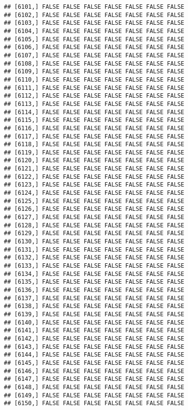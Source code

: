\documentclass[
]{article}
\begin{document}
\begin{verbatim}
## [6101,] FALSE FALSE FALSE FALSE FALSE FALSE FALSE
## [6102,] FALSE FALSE FALSE FALSE FALSE FALSE FALSE
## [6103,] FALSE FALSE FALSE FALSE FALSE FALSE FALSE
## [6104,] FALSE FALSE FALSE FALSE FALSE FALSE FALSE
## [6105,] FALSE FALSE FALSE FALSE FALSE FALSE FALSE
## [6106,] FALSE FALSE FALSE FALSE FALSE FALSE FALSE
## [6107,] FALSE FALSE FALSE FALSE FALSE FALSE FALSE
## [6108,] FALSE FALSE FALSE FALSE FALSE FALSE FALSE
## [6109,] FALSE FALSE FALSE FALSE FALSE FALSE FALSE
## [6110,] FALSE FALSE FALSE FALSE FALSE FALSE FALSE
## [6111,] FALSE FALSE FALSE FALSE FALSE FALSE FALSE
## [6112,] FALSE FALSE FALSE FALSE FALSE FALSE FALSE
## [6113,] FALSE FALSE FALSE FALSE FALSE FALSE FALSE
## [6114,] FALSE FALSE FALSE FALSE FALSE FALSE FALSE
## [6115,] FALSE FALSE FALSE FALSE FALSE FALSE FALSE
## [6116,] FALSE FALSE FALSE FALSE FALSE FALSE FALSE
## [6117,] FALSE FALSE FALSE FALSE FALSE FALSE FALSE
## [6118,] FALSE FALSE FALSE FALSE FALSE FALSE FALSE
## [6119,] FALSE FALSE FALSE FALSE FALSE FALSE FALSE
## [6120,] FALSE FALSE FALSE FALSE FALSE FALSE FALSE
## [6121,] FALSE FALSE FALSE FALSE FALSE FALSE FALSE
## [6122,] FALSE FALSE FALSE FALSE FALSE FALSE FALSE
## [6123,] FALSE FALSE FALSE FALSE FALSE FALSE FALSE
## [6124,] FALSE FALSE FALSE FALSE FALSE FALSE FALSE
## [6125,] FALSE FALSE FALSE FALSE FALSE FALSE FALSE
## [6126,] FALSE FALSE FALSE FALSE FALSE FALSE FALSE
## [6127,] FALSE FALSE FALSE FALSE FALSE FALSE FALSE
## [6128,] FALSE FALSE FALSE FALSE FALSE FALSE FALSE
## [6129,] FALSE FALSE FALSE FALSE FALSE FALSE FALSE
## [6130,] FALSE FALSE FALSE FALSE FALSE FALSE FALSE
## [6131,] FALSE FALSE FALSE FALSE FALSE FALSE FALSE
## [6132,] FALSE FALSE FALSE FALSE FALSE FALSE FALSE
## [6133,] FALSE FALSE FALSE FALSE FALSE FALSE FALSE
## [6134,] FALSE FALSE FALSE FALSE FALSE FALSE FALSE
## [6135,] FALSE FALSE FALSE FALSE FALSE FALSE FALSE
## [6136,] FALSE FALSE FALSE FALSE FALSE FALSE FALSE
## [6137,] FALSE FALSE FALSE FALSE FALSE FALSE FALSE
## [6138,] FALSE FALSE FALSE FALSE FALSE FALSE FALSE
## [6139,] FALSE FALSE FALSE FALSE FALSE FALSE FALSE
## [6140,] FALSE FALSE FALSE FALSE FALSE FALSE FALSE
## [6141,] FALSE FALSE FALSE FALSE FALSE FALSE FALSE
## [6142,] FALSE FALSE FALSE FALSE FALSE FALSE FALSE
## [6143,] FALSE FALSE FALSE FALSE FALSE FALSE FALSE
## [6144,] FALSE FALSE FALSE FALSE FALSE FALSE FALSE
## [6145,] FALSE FALSE FALSE FALSE FALSE FALSE FALSE
## [6146,] FALSE FALSE FALSE FALSE FALSE FALSE FALSE
## [6147,] FALSE FALSE FALSE FALSE FALSE FALSE FALSE
## [6148,] FALSE FALSE FALSE FALSE FALSE FALSE FALSE
## [6149,] FALSE FALSE FALSE FALSE FALSE FALSE FALSE
## [6150,] FALSE FALSE FALSE FALSE FALSE FALSE FALSE

\end{verbatim}
\end{document}
